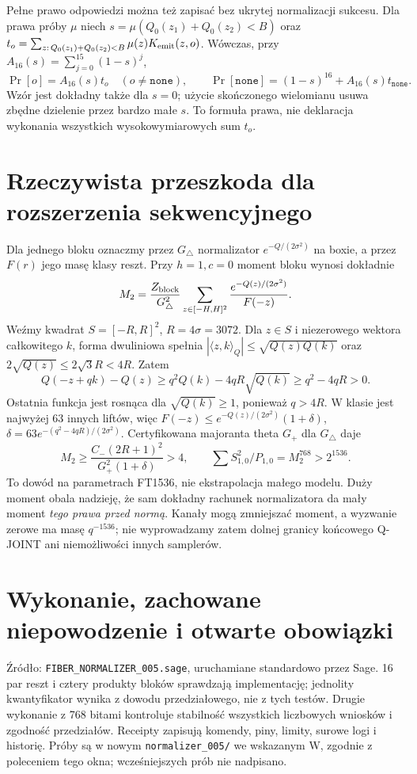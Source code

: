 \documentclass[11pt,a4paper]{article}
\newcommand{\code}[1]{\nolinkurl{#1}}
\begin{document}
Pełne prawo odpowiedzi można też zapisać bez ukrytej normalizacji sukcesu.
Dla prawa próby $\mu$ niech $s=\mu(Q_0(z_1)+Q_0(z_2)<B)$ oraz
$t_o=\sum_{z:\,Q_0(z_1)+Q_0(z_2)<B}\mu(z)K_{\rm emit}(z,o)$.
Wówczas, przy $A_{16}(s)=\sum_{j=0}^{15}(1-s)^j$,
\[
 \Pr[o]=A_{16}(s)t_o\quad(o\ne\mathtt{none}),\qquad
 \Pr[\mathtt{none}]=(1-s)^{16}+A_{16}(s)t_{\mathtt{none}}.
\]
Wzór jest dokładny także dla $s=0$; użycie skończonego wielomianu
usuwa zbędne dzielenie przez bardzo małe $s$. To formuła prawa,
nie deklaracja wykonania wszystkich wysokowymiarowych sum $t_o$.

\section{Rzeczywista przeszkoda dla rozszerzenia sekwencyjnego}
Dla jednego bloku oznaczmy przez $G_\triangle$ normalizator
$e^{-Q/(2\sigma^2)}$ na boxie, a przez $F(r)$ jego masę klasy reszt.
Przy $h=1,c=0$ moment bloku wynosi dokładnie
\[
 M_2=\frac{Z_{\rm block}}{G_\triangle^2}
       \sum_{z\in[-H,H]^2}\frac{e^{-Q(z)/(2\sigma^2)}}{F(-z)}.
\]
Weźmy kwadrat $S=[-R,R]^2$, $R=4\sigma=3072$.
Dla $z\in S$ i niezerowego wektora całkowitego $k$, forma dwuliniowa
spełnia $|\langle z,k\rangle_Q|\le\sqrt{Q(z)Q(k)}$ oraz
$2\sqrt{Q(z)}\le2\sqrt3 R<4R$.
Zatem
\[
 Q(-z+qk)-Q(z)\ge q^2Q(k)-4qR\sqrt{Q(k)}\ge q^2-4qR>0.
\]
Ostatnia funkcja jest rosnąca dla $\sqrt{Q(k)}\ge1$, ponieważ $q>4R$.
W klasie jest najwyżej 63 innych liftów, więc
$F(-z)\le e^{-Q(z)/(2\sigma^2)}(1+\delta)$,
$\delta=63e^{-(q^2-4qR)/(2\sigma^2)}$.
Certyfikowana majoranta theta $G_+$ dla $G_\triangle$ daje
\[
 M_2\ge\frac{C_-(2R+1)^2}{G_+^2(1+\delta)}>4,
 \qquad \sum S_{1,0}^2/P_{1,0}=M_2^{768}>2^{1536}.
\]
To dowód na parametrach FT1536, nie ekstrapolacja małego modelu.
Duży moment obala nadzieję, że sam dokładny rachunek normalizatora da
mały moment \emph{tego prawa przed normą}. Kanały mogą zmniejszać moment,
a wyzwanie zerowe ma masę $q^{-1536}$; nie wyprowadzamy zatem dolnej
granicy końcowego Q-JOINT ani niemożliwości innych samplerów.

\section{Wykonanie, zachowane niepowodzenie i otwarte obowiązki}
Źródło: \code{FIBER_NORMALIZER_005.sage}, uruchamiane standardowo przez Sage.
16 par reszt i cztery produkty bloków sprawdzają implementację;
jednolity kwantyfikator wynika z dowodu przedziałowego, nie z tych testów.
Drugie wykonanie z 768 bitami kontroluje stabilność wszystkich liczbowych
wniosków i zgodność przedziałów. Receipty zapisują komendy, piny, limity,
surowe logi i historię. Próby są w nowym \code{normalizer_005/} we wskazanym W,
zgodnie z poleceniem tego okna; wcześniejszych prób nie nadpisano.
\end{document}
